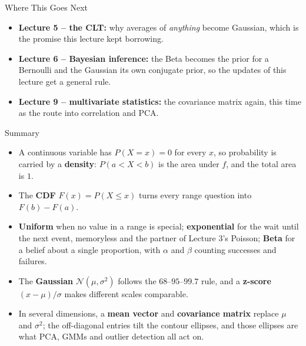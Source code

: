 \begin{frame}{Where This Goes Next}
\begin{itemize}
  \item \textbf{Lecture 5 -- the CLT:} why averages of \emph{anything} become Gaussian, which is the promise this lecture kept borrowing.
  \pause
  \item \textbf{Lecture 6 -- Bayesian inference:} the Beta becomes the prior for a Bernoulli and the Gaussian its own conjugate prior, so the updates of this lecture get a general rule.
  \pause
  \item \textbf{Lecture 9 -- multivariate statistics:} the covariance matrix again, this time as the route into correlation and PCA.
\end{itemize}
\end{frame}

\begin{frame}{Summary}
\begin{itemize}
  \item A continuous variable has $P(X = x) = 0$ for every $x$, so probability is carried by a \textbf{density}: $P(a<X<b)$ is the area under $f$, and the total area is $1$.
  \pause
  \item The \textbf{CDF} $F(x) = P(X \le x)$ turns every range question into $F(b) - F(a)$.
  \pause
  \item \textbf{Uniform} when no value in a range is special; \textbf{exponential} for the wait until the next event, memoryless and the partner of Lecture 3's Poisson; \textbf{Beta} for a belief about a single proportion, with $\alpha$ and $\beta$ counting successes and failures.
  \pause
  \item The \textbf{Gaussian} $\mathcal{N}(\mu,\sigma^2)$ follows the $68$--$95$--$99.7$ rule, and a \textbf{z-score} $(x-\mu)/\sigma$ makes different scales comparable.
  \pause
  \item In several dimensions, a \textbf{mean vector} and \textbf{covariance matrix} replace $\mu$ and $\sigma^2$; the off-diagonal entries tilt the contour ellipses, and those ellipses are what PCA, GMMs and outlier detection all act on.
\end{itemize}
\end{frame}

